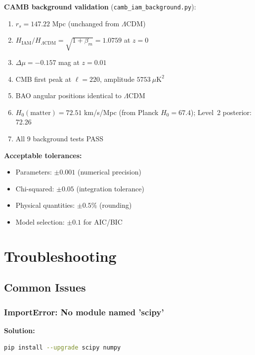 \documentclass[11pt]{article}
\begin{document}
\noindent\textbf{CAMB background validation} (\texttt{camb\_iam\_background.py}):
\begin{enumerate}
    \item[$\square$] $r_s = 147.22$ Mpc (unchanged from $\Lambda$CDM)
    \item[$\square$] $H_\text{IAM}/H_{\Lambda\text{CDM}} = \sqrt{1 + \beta_m} = 1.0759$ at $z = 0$
    \item[$\square$] $\Delta\mu = -0.157$ mag at $z = 0.01$
    \item[$\square$] CMB first peak at $\ell = 220$, amplitude $5753~\mu\text{K}^2$
    \item[$\square$] BAO angular positions identical to $\Lambda$CDM
    \item[$\square$] $H_0(\text{matter}) = 72.51$ km/s/Mpc (from Planck $H_0 = 67.4$); Level~2 posterior: 72.26
    \item[$\square$] All 9 background tests PASS
\end{enumerate}

\noindent\textbf{Acceptable tolerances:}
\begin{itemize}
    \item Parameters: $\pm 0.001$ (numerical precision)
    \item Chi-squared: $\pm 0.05$ (integration tolerance)
    \item Physical quantities: $\pm 0.5\%$ (rounding)
    \item Model selection: $\pm 0.1$ for AIC/BIC
\end{itemize}

\section{Troubleshooting}

\subsection{Common Issues}

\subsubsection{ImportError: No module named 'scipy'}

\textbf{Solution:}
\begin{lstlisting}[language=bash]
pip install --upgrade scipy numpy
\end{lstlisting}
\end{document}
